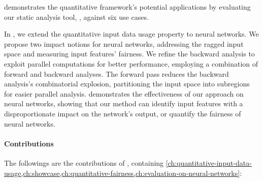 
 demonstrates the quantitative framework's potential applications by evaluating our static analysis tool, \impatto\sidenote{\label{intro:impatto}\impattourl}, against six use cases.


In , we extend the quantitative input data usage property to neural networks.
We propose two impact notions for neural networks, addressing the ragged input space and measuring input features' fairness.
We refine the backward analysis to exploit parallel computations for better performance, employing a combination of forward and backward analyses.
The forward pass reduces the backward analysis's combinatorial explosion, partitioning the input space into subregions for easier parallel analysis.
 demonstrates the effectiveness of our approach on neural networks, showing that our method can identify input features with a disproportionate impact on the network's output, or quantify the fairness of neural networks.



\paragraph{Contributions}
The followings are the contributions of , containing \cref{ch:quantitative-input-data-usage,ch:showcase,ch:quantitative-fairness,ch:evaluation-on-neural-networks}:

